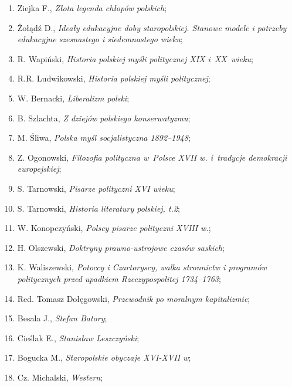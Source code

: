 \documentclass[a4paper,11pt]{article}
\begin{document}
\begin{enumerate}
\item Ziejka F., \emph{Złota legenda chłopów polskich};

\item Żołądź D., \emph{Ideały edukacyjne doby staropolskiej. Stanowe
    modele i potrzeby edukacyjne szesnastego i siedemnastego wieku};

\item R. Wapiński, \emph{Historia polskiej myśli politycznej XIX
    i~XX~wieku};

\item R.R. Ludwikowski, \emph{Historia polskiej myśli politycznej};

\item W. Bernacki, \emph{Liberalizm polski};

\item B. Szlachta, \emph{Z dziejów polskiego konserwatyzmu};

\item M. Śliwa, \emph{Polska myśl socjalistyczna 1892--1948};

\item Z. Ogonowski, \emph{Filozofia polityczna w~Polsce XVII w.
    i~tradycje demokracji europejskiej};

\item S. Tarnowski, \emph{Pisarze polityczni XVI wieku};

\item S. Tarnowski, \emph{Historia literatury polskiej, t.2};

\item W. Konopczyński, \emph{Polscy pisarze polityczni XVIII w.};

\item H. Olszewski, \emph{Doktryny prawno-ustrojowe czasów saskich};
\item K. Waliszewski, \emph{Potoccy i Czartoryscy, walka stronnictw i
    programów politycznych przed upadkiem Rzeczypospolitej 1734--1763};

\item Red. Tomasz Dołęgowski, \emph{Przewodnik po moralnym
    kapitalizmie};

\item Besala J., \emph{Stefan Batory};

\item Cieślak E., \emph{Stanisław Leszczyński};

\item Bogucka M., \emph{Staropolskie obyczaje XVI-XVII w};

\item Cz. Michalski, \emph{Western};


\end{enumerate}
\end{document}
